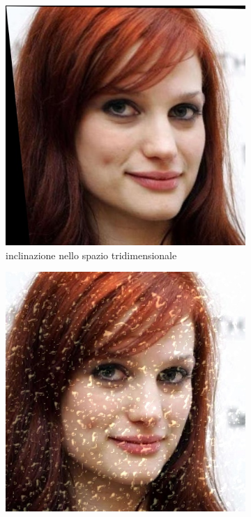 \begin{figure}[ht]
\begin{subfigure}{0.2\textwidth}
\includegraphics[width=\textwidth]{./Images/skew.jpg}
\caption{inclinazione nello spazio tridimensionale}
\label{sfig:corruption_skew}
\end{subfigure}\hfill
\begin{subfigure}{0.2\textwidth}
\includegraphics[width=\textwidth]{./Images/spatter_severity_3.jpg}

\end{subfigure}
\end{figure}
